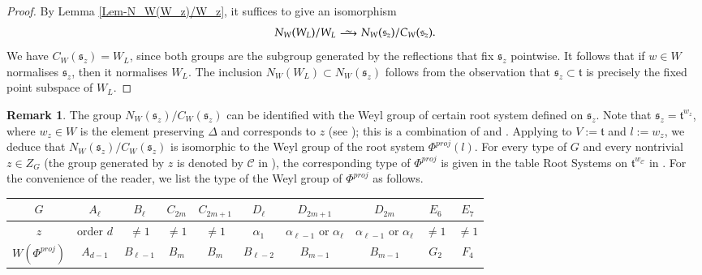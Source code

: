 \documentclass[11pt,oneside,dvipsnames]{amsart}
\theoremstyle{plain}
\theoremstyle{definition}
\newtheorem{Rem}[Thm]{Remark}
\theoremstyle{named}
\DeclareMathOperator{\lisom}{\!\!\smash{\begin{array}{c}\sim\\[-1em]
\longrightarrow\end{array}}\!\!}
\begin{document}
\begin{proof}
By Lemma \ref{Lem-N_W(W_z)/W_z}, it suffices to give an isomorphism
$$
N_W(W_L)/W_L\lisom N_W(\mathfrak{s}_z)/C_W(\mathfrak{s}_z).
$$
We have $C_W(\mathfrak{s}_z)=W_L$, since both groups are the subgroup generated by the reflections that fix $\mathfrak{s}_z$ pointwise. It follows that if $w\in W$ normalises $\mathfrak{s}_z$, then it normalises $W_L$. The inclusion $N_W(W_L)\subset N_W(\mathfrak{s}_z)$ follows from the observation that $\mathfrak{s}_z\subset\mathfrak{t}$ is precisely the fixed point subspace of $W_L$. 
\end{proof}
\begin{Rem}\label{Rem-type-Phi-proj}
The group $N_W(\mathfrak{s}_z)/C_W(\mathfrak{s}_z)$ can be identified with the Weyl group of certain root system defined on $\mathfrak{s}_z$. Note that $\mathfrak{s}_z=\mathfrak{t}^{w_z}$, where $w_z\in W$ is the element preserving $\Delta$ and corresponds to $z$ (see \cite[Equation (3.7)]{Bon}); this is a combination of \cite[Proposition 3.5.4]{BFM} and \cite[Proposition 4.2.1]{BFM}. Applying \cite[Proposition 6.3.4 and Proposition 6.5.5]{BFM} to $V:=\mathfrak{t}$ and $l:=w_z$, we deduce that $N_W(\mathfrak{s}_z)/C_W(\mathfrak{s}_z)$ is isomorphic to the Weyl group of the root system $\Phi^{proj}(l)$. For every type of $G$ and every nontrivial $z\in Z_G$ (the group generated by $z$ is denoted by $\mathcal{C}$ in \cite{BFM}), the corresponding type of $\Phi^{proj}$ is given in the table Root Systems on $\mathfrak{t}^{w_{\mathcal{C}}}$ in \cite[Diagrams and tables]{BFM}. For the convenience of the reader, we list the type of the Weyl group of $\Phi^{proj}$ as follows.
\begin{center}
\begin{tabular}{|c|c|c|c|c|c|c|c|c|c|}
\hline
$G$ & $A_{\ell}$ & $B_{\ell}$ & $C_{2m}$ & $C_{2m+1}$ & $D_{\ell}$ & $D_{2m+1}$ & $D_{2m}$ & $E_6$ & $E_7$ \\
\hline
$z$ & order $d$ & $\ne 1$ & $\ne 1$ & $\ne1$ & $\alpha_1$ & $\alpha_{\ell-1}$ or $\alpha_{\ell}$ & $\alpha_{\ell-1}$ or $\alpha_{\ell}$ & $\ne1$ & $\ne1$ \\ 
\hline
$W(\Phi^{proj})$ & $A_{d-1}$ & $B_{\ell-1}$ & $B_{m}$ & $B_{m}$ & $B_{\ell-2}$ & $B_{m-1}$ & $B_{m-1}$ & $G_2$ & $F_4$ \\
\hline
\end{tabular}
\end{center}
\end{Rem}
\end{document}
